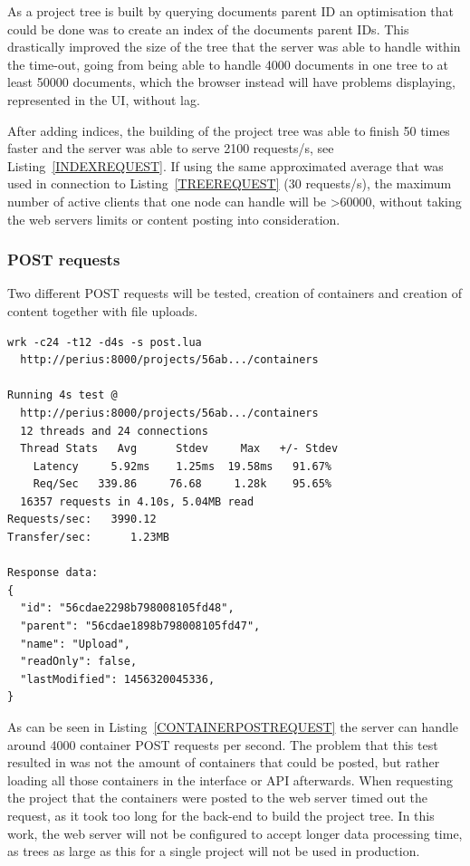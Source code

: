 \documentclass[a4paper,12pt]{article}
\begin{document}
\par As a project tree is built by querying documents parent ID an optimisation that could be done was
to create an index of the documents parent IDs. This drastically improved the size of the tree that
the server was able to handle within the time-out, going from being able to handle 4000 documents in 
one tree to at least 50000 documents, which the browser instead will have problems displaying, 
represented in the UI, without lag.

\par After adding indices, the building of the project tree was able to finish 50 times faster and
the server was able to serve 2100 requests/s, see Listing~\ref{INDEXREQUEST}. If using the same
approximated average that was used in connection to Listing~\ref{TREEREQUEST} (30 requests/s), the
maximum number of active clients that one node can handle will be >60000, without taking the web
servers limits or content posting into consideration.

\subsubsection{POST requests}
Two different POST requests will be tested, creation of containers and creation of content together
with file uploads. 

\begin{minipage}{\linewidth-1cm}
\begin{lstlisting}[label=CONTAINERPOSTREQUEST,caption=Result of container creation]
wrk -c24 -t12 -d4s -s post.lua 
  http://perius:8000/projects/56ab.../containers 
  
Running 4s test @ 
  http://perius:8000/projects/56ab.../containers
  12 threads and 24 connections
  Thread Stats   Avg      Stdev     Max   +/- Stdev
    Latency     5.92ms    1.25ms  19.58ms   91.67%
    Req/Sec   339.86     76.68     1.28k    95.65%
  16357 requests in 4.10s, 5.04MB read
Requests/sec:   3990.12
Transfer/sec:      1.23MB

Response data:
{
  "id": "56cdae2298b798008105fd48",
  "parent": "56cdae1898b798008105fd47",
  "name": "Upload",
  "readOnly": false,
  "lastModified": 1456320045336,
}
\end{lstlisting}
\end{minipage}

As can be seen in Listing~\ref{CONTAINERPOSTREQUEST} the server can handle around 4000 container
POST requests per second. The problem that this test resulted in was not the amount of containers
that could be posted, but rather loading all those containers in the interface or API afterwards.
When requesting the project that the containers were posted to the web server timed out the request,
as it took too long for the back-end to build the project tree. In this work, the web server will
not  
be configured to accept longer data processing time, as trees as large as this for a single project
will not be used in production.
\end{document}
